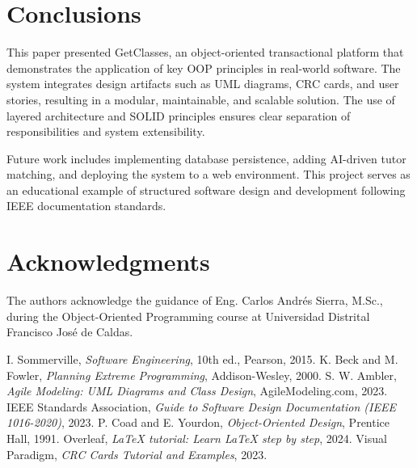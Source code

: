 \documentclass[conference]{IEEEtran}
\begin{document}
\section{Conclusions}
This paper presented GetClasses, an object-oriented transactional platform that demonstrates the application of key OOP principles in real-world software. The system integrates design artifacts such as UML diagrams, CRC cards, and user stories, resulting in a modular, maintainable, and scalable solution. The use of layered architecture and SOLID principles ensures clear separation of responsibilities and system extensibility.

Future work includes implementing database persistence, adding AI-driven tutor matching, and deploying the system to a web environment. This project serves as an educational example of structured software design and development following IEEE documentation standards.

\section*{Acknowledgments}
The authors acknowledge the guidance of Eng. Carlos Andr\'es Sierra, M.Sc., during the Object-Oriented Programming course at Universidad Distrital Francisco Jos\'e de Caldas.

\begin{thebibliography}{00}
 I. Sommerville, \textit{Software Engineering}, 10th ed., Pearson, 2015.
 K. Beck and M. Fowler, \textit{Planning Extreme Programming}, Addison-Wesley, 2000.
 S. W. Ambler, \textit{Agile Modeling: UML Diagrams and Class Design}, AgileModeling.com, 2023.
 IEEE Standards Association, \textit{Guide to Software Design Documentation (IEEE 1016-2020)}, 2023.
 P. Coad and E. Yourdon, \textit{Object-Oriented Design}, Prentice Hall, 1991.
 Overleaf, \textit{LaTeX tutorial: Learn LaTeX step by step}, 2024.
 Visual Paradigm, \textit{CRC Cards Tutorial and Examples}, 2023.
\end{thebibliography}
\end{document}
